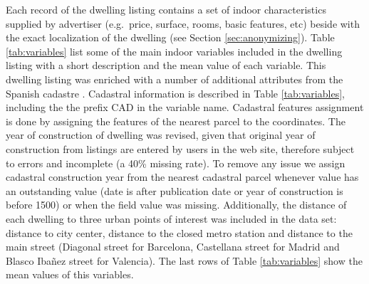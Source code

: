 \documentclass[Royal,times,sageh]{sagej}
\begin{document}
Each record of the dwelling listing contains a set of indoor
characteristics supplied by advertiser (e.g.~price, surface, rooms,
basic features, etc) beside with the exact localization of the dwelling
(see Section \ref{sec:anonymizing}). Table \ref{tab:variables} list some
of the main indoor variables included in the dwelling listing with a
short description and the mean value of each variable. This dwelling
listing was enriched with a number of additional attributes from the
Spanish cadastre \citep{Catastro}. Cadastral information is described in
Table \ref{tab:variables}, including the the prefix CAD in the variable
name. Cadastral features assignment is done by assigning the features of
the nearest parcel to the coordinates. The year of construction of
dwelling was revised, given that original year of construction from
listings are entered by users in the web site, therefore subject to
errors and incomplete (a 40\% missing rate). To remove any issue we
assign cadastral construction year from the nearest cadastral parcel
whenever value has an outstanding value (date is after publication date
or year of construction is before 1500) or when the field value was
missing. Additionally, the distance of each dwelling to three urban
points of interest was included in the data set: distance to city
center, distance to the closed metro station and distance to the main
street (Diagonal street for Barcelona, Castellana street for Madrid and
Blasco Ibañez street for Valencia). The last rows of Table
\ref{tab:variables} show the mean values of this variables.
\end{document}
